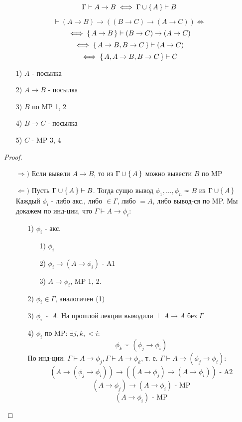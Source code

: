 \begin{lemma}[О дедукции]
\[
\Gamma \vdash A \rightarrow B \iff \Gamma \cup \set{A} \vdash B
\]
\end{lemma}
\begin{example}[Силлогизм]
\[
 \vdash (A \rightarrow B) \rightarrow ((B \rightarrow C) \rightarrow (A \rightarrow C)) \iff
\]
\[
\iff \set{A \rightarrow B} \vdash (B \rightarrow C) \rightarrow (A \rightarrow C)
\]
\[
\iff \set{A \rightarrow B, B \rightarrow C} \vdash (A \rightarrow C)
\]
\[
\iff \set{A, A \rightarrow B, B \rightarrow C} \vdash C
\]
\begin{itemize}
  \item [1) ] $A$ - посылка
  \item [2) ] $A \rightarrow B$ - посылка
  \item [3) ] $B$ по MP 1, 2
  \item [4) ] $B \rightarrow C$ - посылка
  \item [5) ] $C$ - MP 3, 4
\end{itemize}
\end{example}
\begin{proof}
\begin{itemize}
  \item [$\Rightarrow)$] Если вывели $A \rightarrow B$, то из $\Gamma \cup \set{A}$ можно вывести $B$ по MP
  \item [$\Leftarrow)$] Пусть $\Gamma \cup \set{A} \vdash B$. Тогда сущю вывод $\phi_1, \ldots, \phi_n \eqcirc B$ из $\Gamma \cup \set{A}$ \\

    Каждый $\phi_i$ - либо акс., либо $\in \Gamma$, либо $= A$, либо вывод-ся по MP. Мы докажем по инд-ции, что $\Gamma \vdash A \rightarrow \phi_i$:
    \begin{itemize}
      \item [1) ] $\phi_i$ - акс.
        \begin{itemize}
          \item [1) ] $\phi_i$
          \item [2) ] $\phi_i \rightarrow (A \rightarrow \phi_i)$ - A1
          \item [3) ] $A \rightarrow \phi_i$, MP 1, 2.
        \end{itemize}
      \item [2) ] $\phi_i \in \Gamma$, аналогичен (1)
      \item [3) ] $\phi_i \eqcirc A$. На прошлой лекции выводили $\vdash A \rightarrow A$ без $\Gamma$
      \item [4) ] $\phi_i$ по MP: $\exists j, k, < i$:
        \[
        \phi_k \eqcirc (\phi_j \rightarrow \phi_i)
        \]
        По инд-ции: $\Gamma \vdash A \rightarrow \phi_j, \Gamma \vdash A \rightarrow \phi_k$, т. е. $\Gamma \vdash A \rightarrow (\phi_j \rightarrow \phi_i)$:
        \[
          (A \rightarrow (\phi_j \rightarrow \phi_i)) \rightarrow ((A \rightarrow \phi_j) \rightarrow (A \rightarrow \phi_i)) \text{ - A2}
        \]
        \[
          (A \rightarrow \phi_j) \rightarrow (A \rightarrow \phi_i) \text{ - MP}
        \]
        \[
          (A \rightarrow \phi_i) \text{ - MP}
        \]
    \end{itemize}
\end{itemize}
\end{proof}
